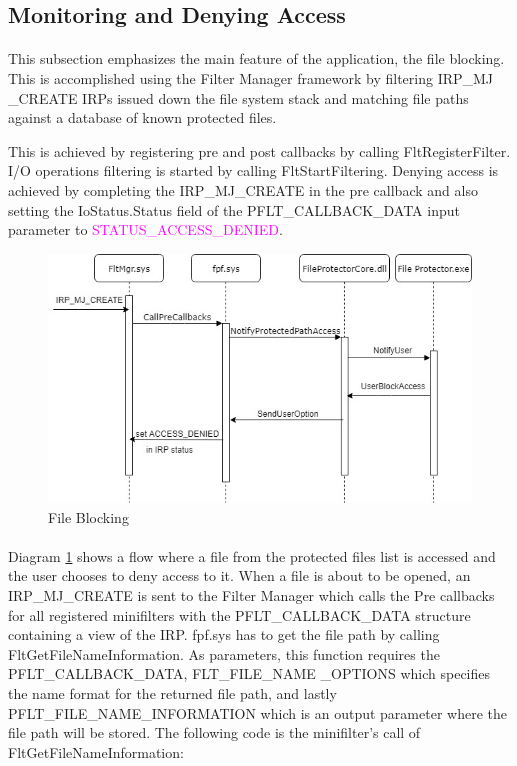 		\subsection{Monitoring and Denying Access}
		\paragraph{}
		This subsection emphasizes the main feature of the application, the file blocking. This is accomplished using the Filter Manager framework by filtering IRP\_MJ \_CREATE IRPs issued down the file system stack and matching file paths against a database of known protected files. 
		
		
		This is achieved by registering pre and post callbacks by calling FltRegisterFilter. I/O operations filtering is started by calling FltStartFiltering. Denying access is achieved by completing the IRP\_MJ\_CREATE in the pre callback and also setting the IoStatus.Status field of the \textcolor{Emerald} {PFLT\_CALLBACK\_DATA} input parameter to \textcolor{Magenta} {STATUS\_ACCESS\_DENIED}.
		
		\begin{figure}[h!]
			\begin{center}
				\includegraphics[scale=0.7]{images/SequenceDiagram.jpg}
				\caption{File Blocking}
				\label{fig:FPFBlockFileDiagram}
			\end{center}
		\end{figure}
	
		\paragraph{}
		Diagram \ref{fig:FPFBlockFileDiagram} shows a flow where a file from the protected files list is accessed and the user chooses to deny access to it. When a file is about to be opened, an IRP\_MJ\_CREATE is sent to the Filter Manager which calls the Pre callbacks for all registered minifilters with the \textcolor{Emerald} {PFLT\_CALLBACK\_DATA} structure containing a view of the IRP. fpf.sys has to get the file path by calling FltGetFileNameInformation. As parameters, this function requires the \textcolor{Emerald}{PFLT\_CALLBACK\_DATA}, \textcolor{Emerald} {FLT\_FILE\_NAME \_OPTIONS} which specifies the name format for the returned file path, and lastly \textcolor{Emerald} {PFLT\_FILE\_NAME\_INFORMATION} which is an output parameter where the file path will be stored. The following code is the minifilter's call of FltGetFileNameInformation:
		
